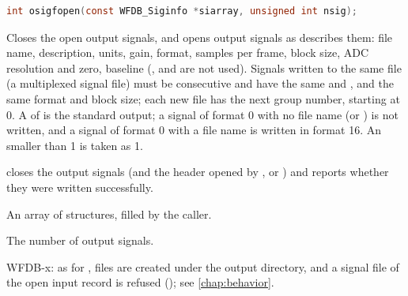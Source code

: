 \begin{lstlisting}[language=C,style=signature]
int osigfopen(const WFDB_Siginfo *siarray, unsigned int nsig);
\end{lstlisting}
Closes the open output signals, and opens  output signals as
 describes them: file name, description, units, gain, format,
samples per frame, block size, ADC resolution and zero, baseline
(,  and  are not used). Signals written
to the same file (a multiplexed signal file) must be consecutive and have the
same  and , and the same format and block size; each
new file has the next group number, starting at 0. A  of
\code{-} is the standard output; a signal of format 0 with no file name (or
\code{\textasciitilde}) is not written, and a signal of format 0 with a file
name is written in format 16. An  smaller than 1 is taken as 1.

 closes the output signals (and the header opened by
,  or ) and reports whether
they were written successfully.
\begin{params}
\item[siarray] An array of   structures,
  filled by the caller.
\item[nsig] The number of output signals.
\end{params}

WFDB-x: as for , files are created under the output directory,
and a signal file of the open input record is refused (); see \cref{chap:behavior}.


